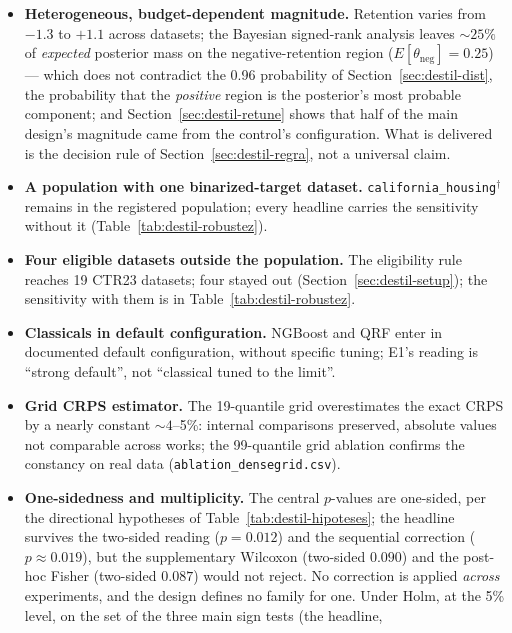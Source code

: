 \begin{itemize}
  \item \textbf{Heterogeneous, budget-dependent magnitude.}
    Retention varies from $-1.3$ to $+1.1$ across datasets; the
    Bayesian signed-rank analysis leaves ${\sim}25\%$ of
    \emph{expected} posterior mass on the negative-retention region
    ($E[\theta_{\text{neg}}]=0.25$) --- which does not contradict
    the 0.96 probability of Section~\ref{sec:destil-dist}, the
    probability that the \emph{positive} region is the posterior's
    most probable component; and
    Section~\ref{sec:destil-retune} shows that half
    of the main design's magnitude came from the control's
    configuration. What is delivered is the decision rule of
    Section~\ref{sec:destil-regra}, not a universal claim.
  \item \textbf{A population with one binarized-target dataset.}
    \texttt{california\_housing}$^\dagger$ remains in the registered
    population; every headline carries the sensitivity without it
    (Table~\ref{tab:destil-robustez}).
  \item \textbf{Four eligible datasets outside the population.} The
    eligibility rule reaches 19 CTR23 datasets; four stayed out
    (Section~\ref{sec:destil-setup}); the sensitivity with them is
    in Table~\ref{tab:destil-robustez}.
  \item \textbf{Classicals in default configuration.} NGBoost and
    QRF enter in documented default configuration, without specific
    tuning; E1's reading is ``strong default'', not ``classical
    tuned to the limit''.
  \item \textbf{Grid CRPS estimator.} The 19-quantile grid
    overestimates the exact CRPS by a nearly constant ${\sim}4$--5\%:
    internal comparisons preserved, absolute values not comparable
    across works; the 99-quantile grid ablation confirms the
    constancy on real data
    (\texttt{ablation\_\allowbreak densegrid.csv}).
  \item \textbf{One-sidedness and multiplicity.} The central
    $p$-values are one-sided, per the directional hypotheses of
    Table~\ref{tab:destil-hipoteses}; the headline survives the
    two-sided reading ($p=0.012$) and the sequential correction
    ($p\approx0.019$), but the supplementary Wilcoxon (two-sided
    $0.090$) and the post-hoc Fisher (two-sided $0.087$) would not
    reject. No correction is applied \emph{across} experiments, and
    the design defines no family for one. Under Holm, at the 5\%
    level, on the set of the three main sign tests (the headline,

\end{itemize}
